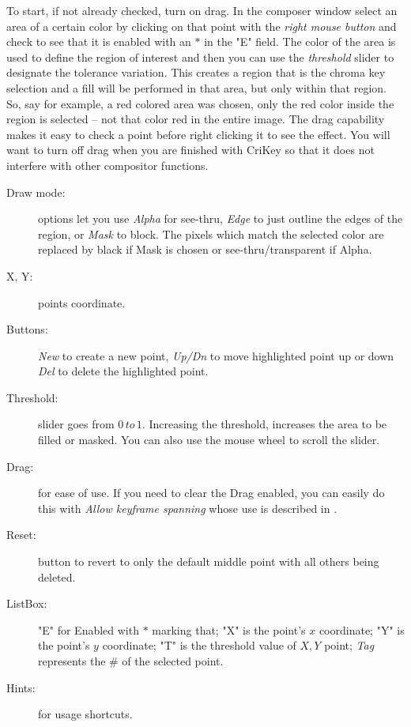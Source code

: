 To start, if not already checked, turn on drag. In the composer window select an area of a certain color by clicking on that point with the \textit{right mouse button} and check to see that it is enabled with an $*$ in the "E" field. The color of the area is used to define the region of interest and then you can use the \textit{threshold} slider to designate the tolerance variation. This creates a region that is the chroma key selection and a fill will be performed in that area, but only within that region. So, say for example, a red colored area was chosen, only the red color inside the region is selected -- not that color red in the entire image. The drag capability makes it easy to check a point before right clicking it to see the effect. You will want to turn off drag when you are finished with CriKey so that it does not interfere with other compositor functions.

\begin{description}
    \item[Draw mode:] options let you use \textit{Alpha} for see-thru, \textit{Edge} to just outline the edges of the region, or \textit{Mask} to block. The pixels which match the selected color are replaced by black if Mask is chosen or see-thru/transparent if Alpha.
    \item[X, Y:] points coordinate.
    \item[Buttons:] \textit{New} to create a new point, \textit{Up/Dn} to move highlighted point up or down \textit{Del} to delete the highlighted point.
    \item[Threshold:] slider goes from $0\, to\, 1$. Increasing the threshold, increases the area to be filled or masked. You can also use the mouse wheel to scroll the slider.
    \item[Drag:] for ease of use. If you need to clear the Drag enabled, you can easily do this with \textit{Allow keyframe spanning} whose use is described in .
    \item[Reset:] button to revert to only the default middle point with all others being deleted.
    \item[ListBox:] "E" for Enabled with $*$ marking that; "X" is the point’s $x$ coordinate; "Y" is the point’s $y$ coordinate; "T" is the threshold value of $X,Y$ point; \textit{Tag} represents the \# of the selected
    point.
    \item[Hints:] for usage shortcuts.
\end{description}


